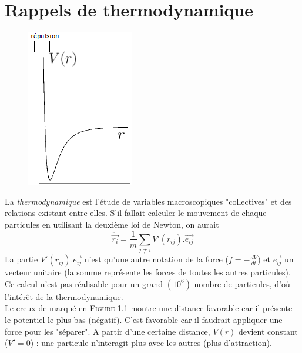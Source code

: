 \documentclass[11pt, a4paper, openany]{book}
\begin{document}
		\section{Rappels de thermodynamique}
		\begin{figure}
			\includegraphics[scale=0.6]{cp/image1.png}
		\end{figure}
		La \textit{thermodynamique} est l'étude de variables macroscopiques "collectives" et des relations existant entre elles. S'il fallait calculer le mouvement de chaque particules en utilisant la deuxième loi de Newton, on aurait
		\begin{equation}
			\ddot{\vec{r_i}} = \frac{1}{m}\sum_{j\neq i} V'(r_{ij}).\vec{e_{ij}}
		\end{equation}
		La partie $V'(r_{ij}).\vec{e_{ij}}$ n'est qu'une autre notation de la force ($f = -\frac{dV}{dt}$) et $\vec{e_{ij}}$ un vecteur unitaire (la somme représente les forces de toutes les autres particules). Ce calcul n'est pas réalisable pour un grand $(10^6)$ nombre de particules, d'où l'intérêt de la thermodynamique.\\
		Le creux de marqué en \textsc{Figure 1.1} montre une distance favorable car il présente le potentiel le plus bas (négatif). C'est favorable car il faudrait appliquer une force pour les "séparer". A partir d'une certaine distance, $V(r)$ devient constant ($V' = 0$) : une particule n'interagit plus avec les autres (plus d'attraction).\\
		
\end{document}
